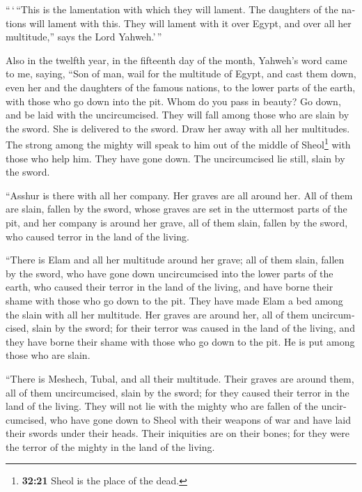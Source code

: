 \begin{paracol}{2}
\begin{otherlanguage}{english}
 ``\,`\,``This is the lamentation with which they will
lament. The daughters of the nations will lament with this. They will
lament with it over Egypt, and over all her multitude,'' says the Lord
Yahweh.'\,''

 Also in the twelfth year, in the fifteenth day of the
month, Yahweh's word came to me, saying,  ``Son of man,
wail for the multitude of Egypt, and cast them down, even her and the
daughters of the famous nations, to the lower parts of the earth, with
those who go down into the pit.  Whom do you pass in
beauty? Go down, and be laid with the uncircumcised. 
They will fall among those who are slain by the sword. She is delivered
to the sword. Draw her away with all her multitudes.  The
strong among the mighty will speak to him out of the middle of
Sheol\footnote{\textbf{32:21} Sheol is the place of the dead.} with
those who help him. They have gone down. The uncircumcised lie still,
slain by the sword.

 ``Asshur is there with all her company. Her graves are
all around her. All of them are slain, fallen by the sword,
 whose graves are set in the uttermost parts of the pit,
and her company is around her grave, all of them slain, fallen by the
sword, who caused terror in the land of the living.

 ``There is Elam and all her multitude around her grave;
all of them slain, fallen by the sword, who have gone down uncircumcised
into the lower parts of the earth, who caused their terror in the land
of the living, and have borne their shame with those who go down to the
pit.  They have made Elam a bed among the slain with all
her multitude. Her graves are around her, all of them uncircumcised,
slain by the sword; for their terror was caused in the land of the
living, and they have borne their shame with those who go down to the
pit. He is put among those who are slain.

 ``There is Meshech, Tubal, and all their multitude.
Their graves are around them, all of them uncircumcised, slain by the
sword; for they caused their terror in the land of the living.
 They will not lie with the mighty who are fallen of the
uncircumcised, who have gone down to Sheol with their weapons of war and
have laid their swords under their heads. Their iniquities are on their
bones; for they were the terror of the mighty in the land of the living.


\end{otherlanguage}
\end{paracol}
